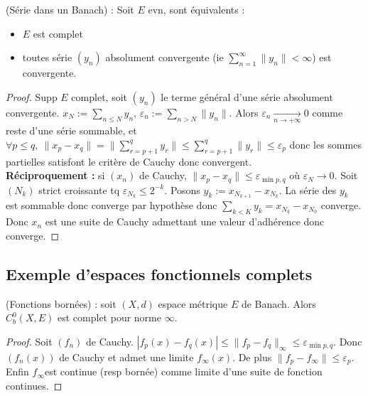 \begin{lemme}
    (Série dans un Banach) : Soit $E$ evn, sont équivalents :
    \begin{itemize}
        \item $E$ est complet
        \item toutes série $(y_n)$ absolument convergente (ie $\sum\limits_{n=1}^{\infty} \|y_n\|<\infty $) est convergente.
    \end{itemize}
\end{lemme}
\begin{proof}
    Supp $E$ complet, soit $(y_n)$ le terme général d'une série absolument convergente. $x_N:=\sum\limits_{n\le N}^{} y_n$, $\varepsilon _n:=\sum\limits_{n>N}^{} \|y_n\|$. Alors $\varepsilon _n \xrightarrow[n\to +\infty]{} 0$ comme reste d'une série sommable, et $\forall p\le q,\ \|x_p-x_q\|=\|\sum\limits_{r=p+1}^{q} y_r\|\le \sum\limits_{r=p+1}^{q} \|y_r\|\le \varepsilon _p $ donc les sommes partielles satisfont le critère de Cauchy donc convergent.\\
    \textbf{Réciproquement :} si $(x_{n})$ de Cauchy, $\|x_p-x_q\|\le \varepsilon _{\min p,q}$ où $\varepsilon _N\to 0$. Soit $(N_k)$ strict croissante tq $\varepsilon _{N_k}\le 2^{-k}$. Posons $y_k:=x_{N_{k+1}}-x_{N_k}$. La série des $y_k$ est sommable donc converge par hypothèse donc $\sum\limits_{k<K}^{} y_k=x_{N_k}-x_{N_0}$ converge. Donc $x_{n}$ est une suite de Cauchy admettant une valeur d'adhérence donc converge.
\end{proof}


\subsection{Exemple d'espaces fonctionnels complets}
\begin{ex}
    (Fonctions bornées) : soit $(X,d)$ espace métrique $E$ de Banach. Alors $C^0_b(X,E)$ est complet pour norme $\infty $.
\end{ex}
\begin{proof}
    Soit $(f_n)$ de Cauchy. $|f_p(x)-f_q(x)|\le \|f_p-f_q\|_\infty \le \varepsilon _{\min p,q}$. Donc $(f_n(x))$ de Cauchy et admet une limite $f_\infty (x)$. De plus $\|f_p-f_\infty \|\le \varepsilon _p$. Enfin $f_\infty $est continue (resp bornée) comme limite d'une suite de fonction continues.
\end{proof}

